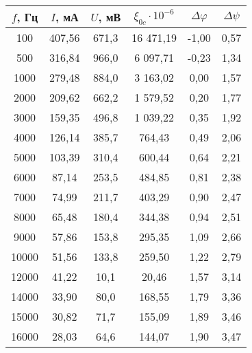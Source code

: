 \begin{table}[h!]
    \centering
    \begin{tabular}{|c|c|c|c|c|c|}
    \hline
    $f$, Гц & $I$, мА  & $U$, мВ   & $\xi_{0c} \cdot 10^{-6}$  & $\Delta \varphi$ & $\Delta \psi$ \\ \hline
    100     & 407,56   & 671,3     & 16 471,19                 & -1,00            & 0,57          \\ \hline
    500     & 316,84   & 966,0     & 6 097,71                  & -0,23            & 1,34          \\ \hline
    1000    & 279,48   & 884,0     & 3 163,02                  & 0,00             & 1,57          \\ \hline
    2000    & 209,62   & 662,2     & 1 579,52                  & 0,20             & 1,77          \\ \hline
    3000    & 159,35   & 496,8     & 1 039,22                  & 0,35             & 1,92          \\ \hline
    4000    & 126,14   & 385,7     & 764,43                    & 0,49             & 2,06          \\ \hline
    5000    & 103,39   & 310,4     & 600,44                    & 0,64             & 2,21          \\ \hline
    6000    & 87,14    & 253,5     & 484,85                    & 0,81             & 2,38          \\ \hline
    7000    & 74,99    & 211,7     & 403,29                    & 0,90             & 2,47          \\ \hline
    8000    & 65,48    & 180,4     & 344,38                    & 0,94             & 2,51          \\ \hline
    9000    & 57,86    & 153,8     & 295,35                    & 1,09             & 2,66          \\ \hline
    10000   & 51,56    & 133,8     & 259,50                    & 1,22             & 2,79          \\ \hline
    12000   & 41,22    & 10,1      & 20,46                     & 1,57             & 3,14          \\ \hline
    14000   & 33,90    & 80,0      & 168,55                    & 1,79             & 3,36          \\ \hline
    15000   & 30,82    & 71,7      & 155,09                    & 1,89             & 3,46          \\ \hline
    16000   & 28,03    & 64,6      & 144,07                    & 1,90             & 3,47          \\ \hline

\end{tabular}
\end{table}
